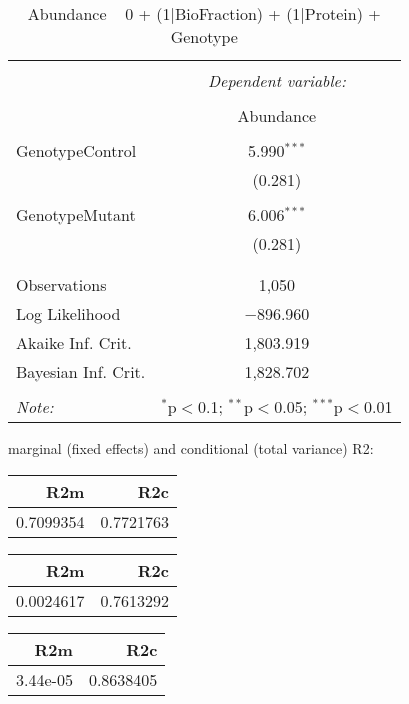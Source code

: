\documentclass[11pt]{report}
\begin{document}
\begin{table}[!htbp] \centering 
  \caption{Abundance ~ 0 + (1|BioFraction) + (1|Protein) + Genotype} 
  \label{} 
\begin{tabular}{@{\extracolsep{5pt}}lc} 
\\[-1.8ex]\hline 
\hline \\[-1.8ex] 
 & \multicolumn{1}{c}{\textit{Dependent variable:}} \\ 
\cline{2-2} 
\\[-1.8ex] & Abundance \\ 
\hline \\[-1.8ex] 
 GenotypeControl & 5.990$^{***}$ \\ 
  & (0.281) \\ 
  & \\ 
 GenotypeMutant & 6.006$^{***}$ \\ 
  & (0.281) \\ 
  & \\ 
\hline \\[-1.8ex] 
Observations & 1,050 \\ 
Log Likelihood & $-$896.960 \\ 
Akaike Inf. Crit. & 1,803.919 \\ 
Bayesian Inf. Crit. & 1,828.702 \\ 
\hline 
\hline \\[-1.8ex] 
\textit{Note:}  & \multicolumn{1}{r}{$^{*}$p$<$0.1; $^{**}$p$<$0.05; $^{***}$p$<$0.01} \\ 
\end{tabular} 
\end{table} 
marginal (fixed effects) and conditional (total variance) R2:

\begin{tabular}{r|r}
\hline
R2m & R2c\\
\hline
0.7099354 & 0.7721763\\
\hline
\end{tabular}

\begin{tabular}{r|r}
\hline
R2m & R2c\\
\hline
0.0024617 & 0.7613292\\
\hline
\end{tabular}

\begin{tabular}{r|r}
\hline
R2m & R2c\\
\hline
3.44e-05 & 0.8638405\\
\hline
\end{tabular}
\end{document}
